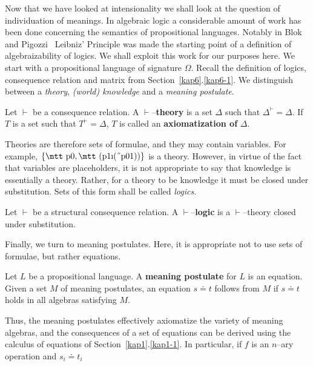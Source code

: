 Now that we have looked at intensionality we shall look at the question
of individuation of meanings. In algebraic logic a considerable amount
of work has been done concerning the semantics of propositional
languages. Notably in Blok and Pigozzi~ 
Leibniz' Principle was made the starting point of a definition of
algebraizability of logics. We shall exploit this work for our purposes
here.  We start with a propositional language of signature $\Omega$.
Recall the definition of logics, consequence relation and matrix from
Section~\ref{kap6}.\ref{kap6-1}. We distinguish between a {\it theory}, 
{\it (world) knowledge\/} and a {\it meaning postulate}.
\begin{defn}
Let $\vdash$ be a consequence relation. A $\vdash$--\textbf{theory} is
a set $\Delta$ such that $\Delta^{\vdash} = \Delta$. If $T$ is a
set such that $T^{\vdash} = \Delta$, $T$ is called an 
\textbf{axiomatization of} $\Delta$.
\end{defn}
Theories are therefore sets of formulae, and they may contain variables.
For example, $\{\mbox{\mtt p0}, \mbox{\mtt (p1\symbol{25}(\symbol{5}p01))}\}$ 
is a theory. However, in virtue of the fact that
variables are placeholders, it is not appropriate to say that knowledge
is essentially a theory. Rather, for a theory to be knowledge it must
be closed under substitution. Sets of this form shall be called
{\it logics}.
\begin{defn}
Let $\vdash$ be a structural consequence relation. A 
$\vdash$--\textbf{logic} is a $\vdash$--theory closed 
under substitution.
\end{defn}
Finally, we turn to meaning postulates. Here, it is appropriate not 
to use sets of formulae, but rather equations.
\begin{defn}
Let $L$ be a propositional language. A \textbf{meaning postulate}
for $L$ is an equation. Given a set $M$ of meaning postulates,
an equation $s \doteq t$ follows from $M$ if $s \doteq t$ holds
in all algebras satisfying $M$.
\end{defn}
Thus, the meaning postulates effectively axiomatize the variety of
meaning algebras, and the consequences of a set of equations can
be derived using the calculus of equations of Section~\ref{kap1}.\ref{kap1-1}.
In particular, if $f$ is an $n$--ary operation and $s_i \doteq t_i$
